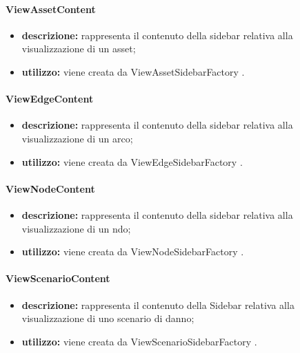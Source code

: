 \paragraph{ViewAssetContent}
\begin{itemize}
	\item \textbf{descrizione:} rappresenta il contenuto della sidebar relativa alla visualizzazione di un asset;
	\item \textbf{utilizzo:} viene creata da ViewAssetSidebarFactory .
\end{itemize}
\paragraph{ViewEdgeContent}
\begin{itemize}
	\item \textbf{descrizione:} rappresenta il contenuto della sidebar relativa alla visualizzazione di un arco;
	\item \textbf{utilizzo:} viene creata da ViewEdgeSidebarFactory .
\end{itemize}
\paragraph{ViewNodeContent}
\begin{itemize}
	\item \textbf{descrizione:} rappresenta il contenuto della sidebar relativa alla visualizzazione di un ndo;
	\item \textbf{utilizzo:} viene creata da ViewNodeSidebarFactory .
\end{itemize}
\paragraph{ViewScenarioContent}
\begin{itemize}
	\item \textbf{descrizione:} rappresenta il contenuto della Sidebar relativa alla visualizzazione di uno scenario di danno;
	\item \textbf{utilizzo:} viene creata da ViewScenarioSidebarFactory .
\end{itemize}
\newpage
